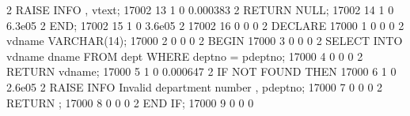 \documentclass[letterpaper,10pt,english,openany,oneside]{sphinxmanual}
\begin{document}
\begin{sphinxVerbatim}[commandchars=\\\{\}]
    2 \textbar{}     RAISE INFO \PYGZsq{} \PYGZpc{}\PYGZsq{}, v\PYGZus{}text;                                     \textbar{}    17002 \textbar{}          13 \textbar{}          1 \textbar{}               0 \textbar{}   0.000383
    2 \textbar{}     RETURN NULL;                                                 \textbar{}    17002 \textbar{}          14 \textbar{}          1 \textbar{}               0 \textbar{}    6.3e\PYGZhy{}05
    2 \textbar{} END;                                                             \textbar{}    17002 \textbar{}          15 \textbar{}          1 \textbar{}               0 \textbar{}    3.6e\PYGZhy{}05
    2 \textbar{}                                                                  \textbar{}    17002 \textbar{}          16 \textbar{}          0 \textbar{}               0 \textbar{}          0
    2 \textbar{} DECLARE                                                          \textbar{}    17000 \textbar{}           1 \textbar{}          0 \textbar{}               0 \textbar{}          0
    2 \textbar{}     v\PYGZus{}dname         VARCHAR(14);                                 \textbar{}    17000 \textbar{}           2 \textbar{}          0 \textbar{}               0 \textbar{}          0
    2 \textbar{} BEGIN                                                            \textbar{}    17000 \textbar{}           3 \textbar{}          0 \textbar{}               0 \textbar{}          0
    2 \textbar{}     SELECT INTO v\PYGZus{}dname dname FROM dept WHERE deptno = p\PYGZus{}deptno; \textbar{}    17000 \textbar{}           4 \textbar{}          0 \textbar{}               0 \textbar{}          0
    2 \textbar{}     RETURN v\PYGZus{}dname;                                              \textbar{}    17000 \textbar{}           5 \textbar{}          1 \textbar{}               0 \textbar{}   0.000647
    2 \textbar{}     IF NOT FOUND THEN                                            \textbar{}    17000 \textbar{}           6 \textbar{}          1 \textbar{}               0 \textbar{}    2.6e\PYGZhy{}05
    2 \textbar{}         RAISE INFO \PYGZsq{}Invalid department number \PYGZpc{}\PYGZsq{}, p\PYGZus{}deptno;      \textbar{}    17000 \textbar{}           7 \textbar{}          0 \textbar{}               0 \textbar{}          0
    2 \textbar{}         RETURN \PYGZsq{}\PYGZsq{};                                               \textbar{}    17000 \textbar{}           8 \textbar{}          0 \textbar{}               0 \textbar{}          0
    2 \textbar{}     END IF;                                                      \textbar{}    17000 \textbar{}           9 \textbar{}          0 \textbar{}               0 \textbar{}          0

\end{sphinxVerbatim}
\end{document}
